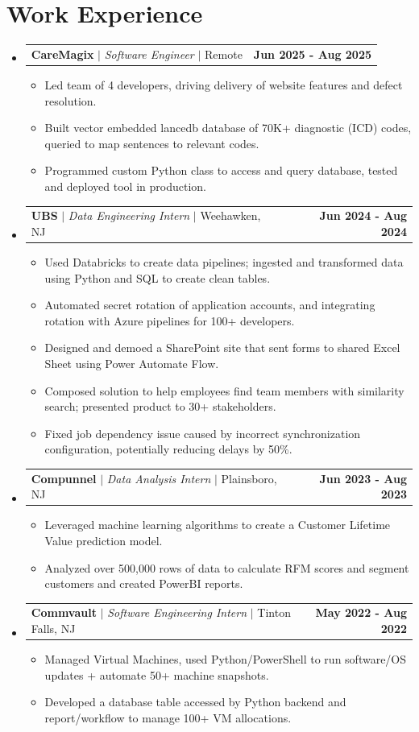 \documentclass[letterpaper,11pt]{article}
\makeatletter
\newcommand{\resumeItem}[1]{
  \item\small{
    {#1 \vspace{-2pt}}
  }
}
\newcommand{\resumeProjectHeading}[2]{
    \item
    \begin{tabular*}{1.001\textwidth}{l@{\extracolsep{\fill}}r}
      \small#1 & \textbf{\small #2}\\
    \end{tabular*}\vspace{-7pt}
}
\newcommand{\resumeSubHeadingListStart}{\begin{itemize}[leftmargin=0.0in, label={}]}
\newcommand{\resumeSubHeadingListEnd}{\end{itemize}}
\newcommand{\resumeItemListStart}{\begin{itemize}}
\newcommand{\resumeItemListEnd}{\end{itemize}\vspace{-5pt}}
\makeatother
\begin{document}
\section{Work Experience}
    \vspace{-5pt}
    \resumeSubHeadingListStart
        \resumeProjectHeading{\textbf{CareMagix} $|$ \emph{Software Engineer} $|$ Remote}{Jun 2025 - Aug 2025}
            \resumeItemListStart
                \resumeItem{
                    Led team of 4 developers, driving delivery of website features and defect resolution.}
                \resumeItem{
                    Built vector embedded lancedb database of 70K+ diagnostic (ICD) codes, queried to map sentences to relevant codes.}
                \resumeItem{
                    Programmed custom Python class to access and query database, tested and deployed tool in production.}
            \resumeItemListEnd
            \vspace{-15pt}
        \resumeProjectHeading{\textbf{UBS} $|$ \emph{Data Engineering Intern} $|$ Weehawken, NJ}{Jun 2024 - Aug 2024}
            \resumeItemListStart
                \resumeItem{Used Databricks to create data pipelines; ingested and transformed data using Python and SQL to create clean tables.}
                \resumeItem {Automated secret rotation of application accounts, and integrating rotation with Azure pipelines for 100+ developers.}
                \resumeItem {Designed and demoed a SharePoint site that sent forms to shared Excel Sheet using Power Automate Flow.}
                \resumeItem {Composed solution to help employees find team members with similarity search; presented product to 30+ stakeholders.}
                \resumeItem {Fixed job dependency issue caused by incorrect synchronization configuration, potentially reducing delays by 50\%.}
            \resumeItemListEnd
            \vspace{-15pt}
        \resumeProjectHeading{\textbf{Compunnel} $|$ \emph{Data Analysis Intern} $|$ Plainsboro, NJ}{Jun 2023 - Aug 2023}
            \resumeItemListStart
                \resumeItem {Leveraged machine learning algorithms to create a Customer Lifetime Value prediction model.} 
                \resumeItem {Analyzed over 500,000 rows of data to calculate RFM scores and segment customers and created PowerBI reports.}
            \resumeItemListEnd
            \vspace{-15pt}
        \resumeProjectHeading{\textbf{Commvault} $|$ \emph{Software Engineering Intern} $|$ Tinton Falls, NJ}{May 2022 - Aug 2022}
            \resumeItemListStart
                \resumeItem {Managed Virtual Machines, used Python/PowerShell to run software/OS updates + automate 50+ machine snapshots.}
                \resumeItem {Developed a database table accessed by Python backend and report/workflow to manage 100+ VM allocations.}
            \resumeItemListEnd
    \resumeSubHeadingListEnd
\end{document}
